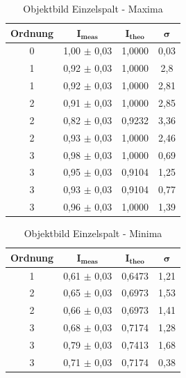 \documentclass{article}
\begin{document}
\begin{table}[!p]
    \centering
    \begin{tabular}{cccc}
        \hline
        \textbf{Ordnung} & $\bm{I_{meas}}$ & $\bm{I_{theo}}$ & $\bm{\sigma}$ \\ \hline
               0 &     1,00 $\pm$ 0,03 &   1,0000 &    0,03 \\ \hline
               1 &     0,92 $\pm$ 0,03 &   1,0000 &    2,8  \\
               1 &     0,92 $\pm$ 0,03 &   1,0000 &    2,81 \\ \hline
               2 &     0,91 $\pm$ 0,03 &   1,0000 &    2,85 \\
               2 &     0,82 $\pm$ 0,03 &   0,9232 &    3,36 \\
               2 &     0,93 $\pm$ 0,03 &   1,0000 &    2,46 \\ \hline
               3 &     0,98 $\pm$ 0,03 &   1,0000 &    0,69 \\
               3 &     0,95 $\pm$ 0,03 &   0,9104 &    1,25 \\
               3 &     0,93 $\pm$ 0,03 &   0,9104 &    0,77 \\
               3 &     0,96 $\pm$ 0,03 &   1,0000 &    1,39 \\ \hline
    \end{tabular}%
    \caption{Objektbild Einzelspalt - Maxima}
    \label{tab:Einzelsp_Obj_Maxima}
\end{table}

\begin{table}[!p]
    \centering
    \begin{tabular}{cccc}
        \hline
        \textbf{Ordnung} & $\bm{I_{meas}}$ & $\bm{I_{theo}}$ & $\bm{\sigma}$ \\ \hline
               1 &     0,61 $\pm$ 0,03 &   0,6473 &    1,21 \\ \hline
               2 &     0,65 $\pm$ 0,03 &   0,6973 &    1,53 \\
               2 &     0,66 $\pm$ 0,03 &   0,6973 &    1,41 \\ \hline
               3 &     0,68 $\pm$ 0,03 &   0,7174 &    1,28 \\
               3 &     0,79 $\pm$ 0,03 &   0,7413 &    1,68 \\
               3 &     0,71 $\pm$ 0,03 &   0,7174 &    0,38 \\ \hline
    \end{tabular}%
    \caption{Objektbild Einzelspalt - Minima}
    \label{tab:Einzelsp_Obj_Minima}
\end{table}
\end{document}
